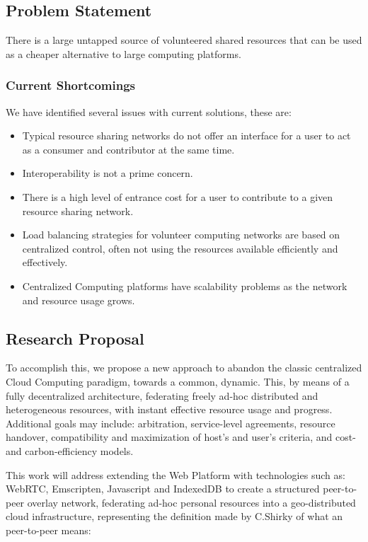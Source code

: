 \subsection{Problem Statement}

There is a large untapped source of volunteered shared resources that can be used as a cheaper alternative to large computing platforms.

\subsubsection{Current Shortcomings}

We have identified several issues with current solutions, these are:

\begin{itemize}
    \item Typical resource sharing networks do not offer an interface for a user to act as a consumer and contributor at the same time.
    \item Interoperability is not a prime concern.
    \item There is a high level of entrance cost for a user to contribute to a given resource sharing network.
    \item Load balancing strategies for volunteer computing networks are based on centralized control,  often not using the resources available efficiently and effectively.
    \item Centralized Computing platforms have scalability problems as the network and resource usage grows.
\end{itemize}

\subsection{Research Proposal}

To accomplish this, we propose a new approach to abandon the classic centralized Cloud Computing paradigm, towards a common, dynamic. This, by means of a fully decentralized architecture, federating freely ad-hoc distributed and heterogeneous resources, with instant effective resource usage and progress. Additional goals may include: arbitration, service-level agreements, resource handover, compatibility and maximization of host's and user's criteria, and cost- and carbon-efficiency models.

This work will address extending the Web Platform with technologies such as: WebRTC, Emscripten, Javascript and IndexedDB to create a structured peer-to-peer overlay network, federating ad-hoc personal resources into a geo-distributed cloud infrastructure, representing the definition made by C.Shirky of what an peer-to-peer means:

